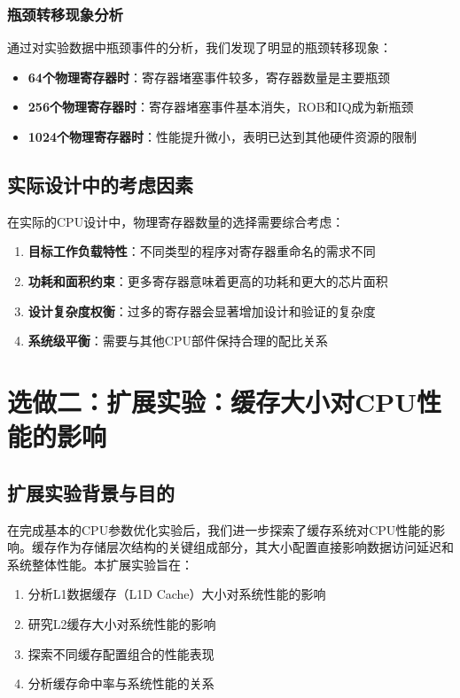 \documentclass[a4paper]{article}
\begin{document}
\subsubsection{瓶颈转移现象分析}

通过对实验数据中瓶颈事件的分析，我们发现了明显的瓶颈转移现象：

\begin{itemize}
    \item \textbf{64个物理寄存器时}：寄存器堵塞事件较多，寄存器数量是主要瓶颈
    \item \textbf{256个物理寄存器时}：寄存器堵塞事件基本消失，ROB和IQ成为新瓶颈
    \item \textbf{1024个物理寄存器时}：性能提升微小，表明已达到其他硬件资源的限制
\end{itemize}

\subsection{实际设计中的考虑因素}

在实际的CPU设计中，物理寄存器数量的选择需要综合考虑：

\begin{enumerate}
    \item \textbf{目标工作负载特性}：不同类型的程序对寄存器重命名的需求不同
    \item \textbf{功耗和面积约束}：更多寄存器意味着更高的功耗和更大的芯片面积
    \item \textbf{设计复杂度权衡}：过多的寄存器会显著增加设计和验证的复杂度
    \item \textbf{系统级平衡}：需要与其他CPU部件保持合理的配比关系
\end{enumerate}

\section{选做二：扩展实验：缓存大小对CPU性能的影响}

\subsection{扩展实验背景与目的}

在完成基本的CPU参数优化实验后，我们进一步探索了缓存系统对CPU性能的影响。缓存作为存储层次结构的关键组成部分，其大小配置直接影响数据访问延迟和系统整体性能。本扩展实验旨在：

\begin{enumerate}
    \item 分析L1数据缓存（L1D Cache）大小对系统性能的影响
    \item 研究L2缓存大小对系统性能的影响
    \item 探索不同缓存配置组合的性能表现
    \item 分析缓存命中率与系统性能的关系
\end{enumerate}
\end{document}
